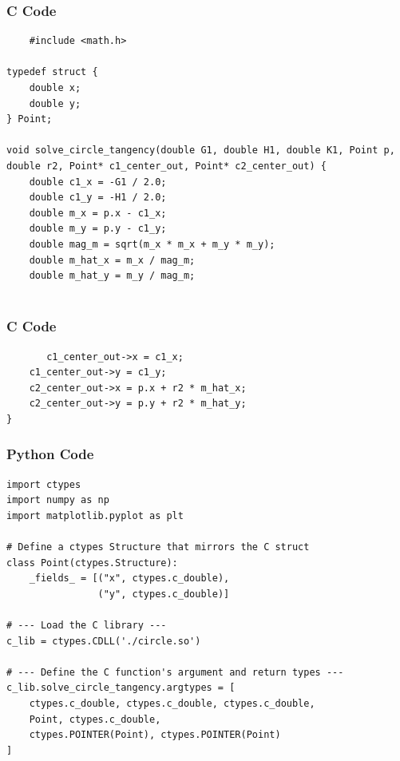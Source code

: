 \documentclass{beamer}
\begin{document}
   
    
    \begin{frame}[fragile]
        \frametitle{C Code}
        \begin{lstlisting}
    #include <math.h>

typedef struct {
    double x;
    double y;
} Point;

void solve_circle_tangency(double G1, double H1, double K1, Point p, double r2, Point* c1_center_out, Point* c2_center_out) {
    double c1_x = -G1 / 2.0;
    double c1_y = -H1 / 2.0;
    double m_x = p.x - c1_x;
    double m_y = p.y - c1_y;
    double mag_m = sqrt(m_x * m_x + m_y * m_y);
    double m_hat_x = m_x / mag_m;
    double m_hat_y = m_y / mag_m;
   
        \end{lstlisting}
    \end{frame}
    
    \begin{frame}[fragile]
        \frametitle{C Code}
        \begin{lstlisting}
       c1_center_out->x = c1_x;
    c1_center_out->y = c1_y;
    c2_center_out->x = p.x + r2 * m_hat_x;
    c2_center_out->y = p.y + r2 * m_hat_y;
}
        \end{lstlisting}
    \end{frame}
    
    
    \begin{frame}[fragile]
        \frametitle{Python Code}
        \begin{lstlisting}
import ctypes
import numpy as np
import matplotlib.pyplot as plt

# Define a ctypes Structure that mirrors the C struct
class Point(ctypes.Structure):
    _fields_ = [("x", ctypes.c_double),
                ("y", ctypes.c_double)]

# --- Load the C library ---
c_lib = ctypes.CDLL('./circle.so')

# --- Define the C function's argument and return types ---
c_lib.solve_circle_tangency.argtypes = [
    ctypes.c_double, ctypes.c_double, ctypes.c_double,
    Point, ctypes.c_double,
    ctypes.POINTER(Point), ctypes.POINTER(Point)
]

        \end{lstlisting}
    \end{frame}
    
\end{document}
